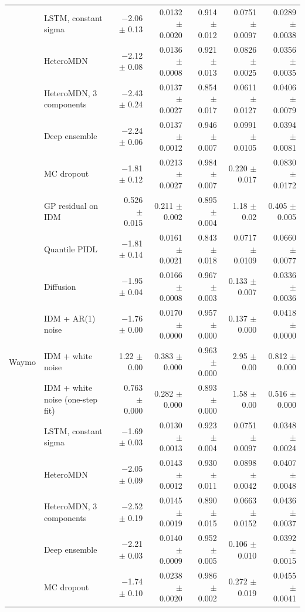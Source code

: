 \begin{longtable}{llrrrrr}
 & LSTM, constant sigma & $-$2.06 $\pm$ 0.13 & 0.0132 $\pm$ 0.0020 & 0.914 $\pm$ 0.012 & 0.0751 $\pm$ 0.0097 & 0.0289 $\pm$ 0.0038 \\
 & HeteroMDN & $-$2.12 $\pm$ 0.08 & 0.0136 $\pm$ 0.0008 & 0.921 $\pm$ 0.013 & 0.0826 $\pm$ 0.0025 & 0.0356 $\pm$ 0.0035 \\
 & HeteroMDN, 3 components & $-$2.43 $\pm$ 0.24 & 0.0137 $\pm$ 0.0027 & 0.854 $\pm$ 0.017 & 0.0611 $\pm$ 0.0127 & 0.0406 $\pm$ 0.0079 \\
 & Deep ensemble & $-$2.24 $\pm$ 0.06 & 0.0137 $\pm$ 0.0012 & 0.946 $\pm$ 0.007 & 0.0991 $\pm$ 0.0105 & 0.0394 $\pm$ 0.0081 \\
 & MC dropout & $-$1.81 $\pm$ 0.12 & 0.0213 $\pm$ 0.0027 & 0.984 $\pm$ 0.007 & 0.220 $\pm$ 0.017 & 0.0830 $\pm$ 0.0172 \\
 & GP residual on IDM & 0.526 $\pm$ 0.015 & 0.211 $\pm$ 0.002 & 0.895 $\pm$ 0.004 & 1.18 $\pm$ 0.02 & 0.405 $\pm$ 0.005 \\
 & Quantile PIDL & $-$1.81 $\pm$ 0.14 & 0.0161 $\pm$ 0.0021 & 0.843 $\pm$ 0.018 & 0.0717 $\pm$ 0.0109 & 0.0660 $\pm$ 0.0077 \\
 & Diffusion & $-$1.95 $\pm$ 0.04 & 0.0166 $\pm$ 0.0008 & 0.967 $\pm$ 0.003 & 0.133 $\pm$ 0.007 & 0.0336 $\pm$ 0.0036 \\
 & IDM + AR(1) noise & $-$1.76 $\pm$ 0.00 & 0.0170 $\pm$ 0.0000 & 0.957 $\pm$ 0.000 & 0.137 $\pm$ 0.000 & 0.0418 $\pm$ 0.0000 \\
\midrule
Waymo & IDM + white noise & 1.22 $\pm$ 0.00 & 0.383 $\pm$ 0.000 & 0.963 $\pm$ 0.000 & 2.95 $\pm$ 0.00 & 0.812 $\pm$ 0.000 \\
 & IDM + white noise (one-step fit) & 0.763 $\pm$ 0.000 & 0.282 $\pm$ 0.000 & 0.893 $\pm$ 0.000 & 1.58 $\pm$ 0.00 & 0.516 $\pm$ 0.000 \\
 & LSTM, constant sigma & $-$1.69 $\pm$ 0.03 & 0.0130 $\pm$ 0.0013 & 0.923 $\pm$ 0.004 & 0.0751 $\pm$ 0.0097 & 0.0348 $\pm$ 0.0024 \\
 & HeteroMDN & $-$2.05 $\pm$ 0.09 & 0.0143 $\pm$ 0.0012 & 0.930 $\pm$ 0.011 & 0.0898 $\pm$ 0.0042 & 0.0407 $\pm$ 0.0048 \\
 & HeteroMDN, 3 components & $-$2.52 $\pm$ 0.19 & 0.0145 $\pm$ 0.0019 & 0.890 $\pm$ 0.015 & 0.0663 $\pm$ 0.0152 & 0.0436 $\pm$ 0.0037 \\
 & Deep ensemble & $-$2.21 $\pm$ 0.03 & 0.0140 $\pm$ 0.0009 & 0.952 $\pm$ 0.005 & 0.106 $\pm$ 0.010 & 0.0392 $\pm$ 0.0015 \\
 & MC dropout & $-$1.74 $\pm$ 0.10 & 0.0238 $\pm$ 0.0020 & 0.986 $\pm$ 0.002 & 0.272 $\pm$ 0.019 & 0.0455 $\pm$ 0.0041 \\

\end{longtable}
